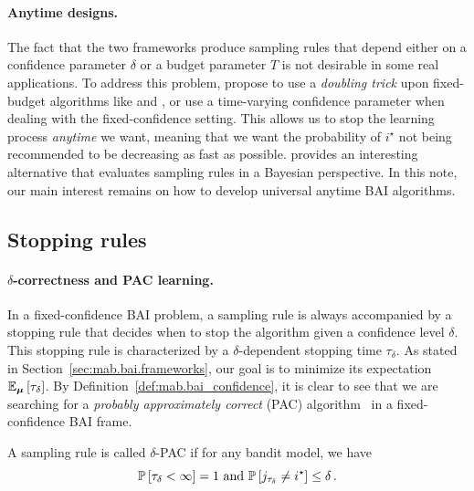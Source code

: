 \paragraph{Anytime designs.}

The fact that the two frameworks produce sampling rules that depend either on a confidence parameter $\delta$ or a budget parameter $T$ is not desirable in some real applications. To address this problem, \cite{jun2016atlucb} propose to use a \emph{doubling trick} upon fixed-budget algorithms like \SR and \SHA, or use a time-varying confidence parameter when dealing with the fixed-confidence setting. This allows us to stop the learning process \emph{anytime} we want, meaning that we want the probability of $i^{\star}$ not being recommended to be decreasing as fast as possible. \cite{russo2016ttts} provides an interesting alternative that evaluates sampling rules in a Bayesian perspective. In this note, our main interest remains on how to develop universal anytime BAI algorithms.

\subsection{Stopping rules}\label{sec:mab.bai.stopping}

\paragraph{$\delta$-correctness and PAC learning.}

In a fixed-confidence BAI problem, a sampling rule is always accompanied by a stopping rule that decides when to stop the algorithm given a confidence level $\delta$. This stopping rule is characterized by a $\delta$-dependent stopping time $\tau_{\delta}$. As stated in Section~\ref{sec:mab.bai.frameworks}, our goal is to minimize its expectation $\mathbb{E}_{{\boldsymbol \mu}}\left[\tau_{\delta}\right]$. By Definition~\ref{def:mab.bai_confidence}, it is clear to see that we are searching for a \emph{probably approximately correct} (PAC) algorithm~\citep{valiant1984pac} in a fixed-confidence BAI frame.

\begin{definition}
\begin{leftbar}[defnbar]
A sampling rule is called $\delta$-PAC if for any bandit model, we have
\[
	\mathbb{P}\left[\tau_\delta < \infty\right] = 1 \text{ and } \mathbb{P}\left[j_{\tau_\delta}\neq i^{\star}\right] \leq \delta\,.
\]
\end{leftbar}
\end{definition}

